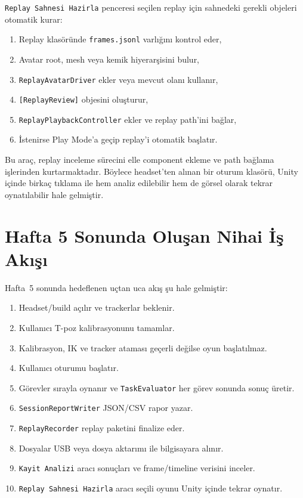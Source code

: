 \documentclass[11pt,a4paper]{article}
\begin{document}
\texttt{Replay Sahnesi Hazirla} penceresi seçilen replay için sahnedeki gerekli
objeleri otomatik kurar:

\begin{enumerate}[nosep]
    \item Replay klasöründe \texttt{frames.jsonl} varlığını kontrol eder,
    \item Avatar root, mesh veya kemik hiyerarşisini bulur,
    \item \texttt{ReplayAvatarDriver} ekler veya mevcut olanı kullanır,
    \item \texttt{[ReplayReview]} objesini oluşturur,
    \item \texttt{ReplayPlaybackController} ekler ve replay path'ini bağlar,
    \item İstenirse Play Mode'a geçip replay'i otomatik başlatır.
\end{enumerate}

Bu araç, replay inceleme sürecini elle component ekleme ve path bağlama
işlerinden kurtarmaktadır. Böylece headset'ten alınan bir oturum klasörü,
Unity içinde birkaç tıklama ile hem analiz edilebilir hem de görsel olarak
tekrar oynatılabilir hale gelmiştir.

\section{Hafta 5 Sonunda Oluşan Nihai İş Akışı}
\label{sec:workflow}

Hafta~5 sonunda hedeflenen uçtan uca akış şu hale gelmiştir:

\begin{enumerate}[nosep]
    \item Headset/build açılır ve trackerlar beklenir.
    \item Kullanıcı T-poz kalibrasyonunu tamamlar.
    \item Kalibrasyon, IK ve tracker ataması geçerli değilse oyun başlatılmaz.
    \item Kullanıcı oturumu başlatır.
    \item Görevler sırayla oynanır ve \texttt{TaskEvaluator} her görev sonunda sonuç üretir.
    \item \texttt{SessionReportWriter} JSON/CSV rapor yazar.
    \item \texttt{ReplayRecorder} replay paketini finalize eder.
    \item Dosyalar USB veya dosya aktarımı ile bilgisayara alınır.
    \item \texttt{Kayit Analizi} aracı sonuçları ve frame/timeline verisini inceler.
    \item \texttt{Replay Sahnesi Hazirla} aracı seçili oyunu Unity içinde tekrar oynatır.
\end{enumerate}
\end{document}
